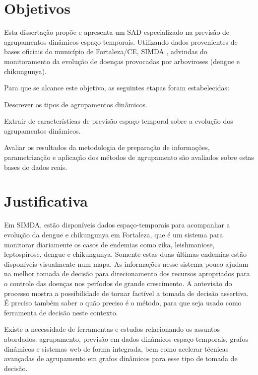 \section{Objetivos}

Esta dissertação propõe e apresenta um \acrshort{SAD} especializado na previsão de agrupamentos dinâmicos espaço-temporais. Utilizando dados provenientes de bases oficiais do município de Fortaleza/CE, \acrfull{SIMDA} \cite{simda}, advindas do monitoramento da evolução de doenças provocadas por arboviroses (dengue e chikungunya). 

Para que se alcance este objetivo, as seguintes etapas foram estabelecidas:

\begin{alineas}
    \item Descrever os tipos de agrupamentos dinâmicos.
	\item Extrair de características de previsão espaço-temporal sobre a evolução dos agrupamentos dinâmicos.
	\item Avaliar os resultados da metodologia de preparação de informações, parametrização e aplicação dos métodos de agrupamento são avaliados sobre estas bases de dados reais.
\end{alineas}

\section{Justificativa}

Em \acrshort{SIMDA}, estão disponíveis dados espaço-temporais para acompanhar a evolução da dengue e chikungunya em Fortaleza, que é um sistema para monitorar diariamente os casos de endemias como zika, leishmaniose, leptospirose, dengue e chikungunya. Somente estas duas últimas endemias estão disponíveis visualmente num mapa. As informações nesse sistema pouco ajudam na melhor tomada de decisão para direcionamento dos recursos apropriados para o controle das doenças nos períodos de grande crescimento. A antevisão do processo mostra a possibilidade de tornar factível a tomada de decisão assertiva. É preciso também saber o quão preciso é o método, para que seja usado como ferramenta de decisão neste contexto.

Existe a necessidade de ferramentas e estudos relacionando os assuntos abordados: agrupamento, previsão em dados dinâmicos espaço-temporais, grafos dinâmicos e sistemas web de forma integrada, bem como acelerar técnicas avançadas de agrupamento em grafos dinâmicos para esse tipo de tomada de decisão.

